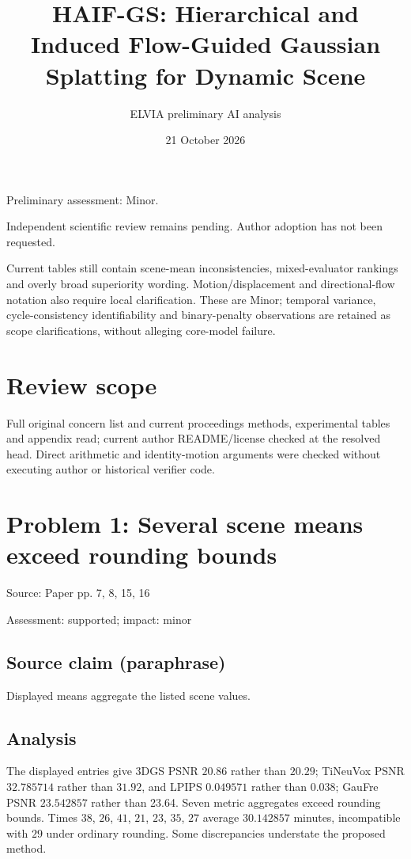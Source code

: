 \documentclass[11pt]{article}
\begin{document}
\title{HAIF-GS: Hierarchical and Induced Flow-Guided Gaussian Splatting for Dynamic Scene}

\author{ELVIA preliminary AI analysis}\date{21 October 2026}\maketitle

Preliminary assessment: Minor.\par

Independent scientific review remains pending. Author adoption has not been requested.

Current tables still contain scene-mean inconsistencies, mixed-evaluator rankings and overly broad superiority wording. Motion/displacement and directional-flow notation also require local clarification. These are Minor; temporal variance, cycle-consistency identifiability and binary-penalty observations are retained as scope clarifications, without alleging core-model failure.

\section*{Review scope}

Full original concern list and current proceedings methods, experimental tables and appendix read; current author README/license checked at the resolved head. Direct arithmetic and identity-motion arguments were checked without executing author or historical verifier code.

\section*{Problem 1: Several scene means exceed rounding bounds}

Source: Paper pp. 7, 8, 15, 16

Assessment: supported; impact: minor

\subsection*{Source claim (paraphrase)}

Displayed means aggregate the listed scene values.

\subsection*{Analysis}

The displayed entries give 3DGS PSNR \(20.86\) rather than \(20.29\); TiNeuVox PSNR \(32.785714\) rather than \(31.92\), and LPIPS \(0.049571\) rather than \(0.038\); GauFre PSNR \(23.542857\) rather than 23.64. Seven metric aggregates exceed rounding bounds. Times \(38\), \(26\), \(41\), \(21\), \(23\), \(35\), \(27\) average \(30.142857\) minutes, incompatible with \(29\) under ordinary rounding. Some discrepancies understate the proposed method.
\end{document}
